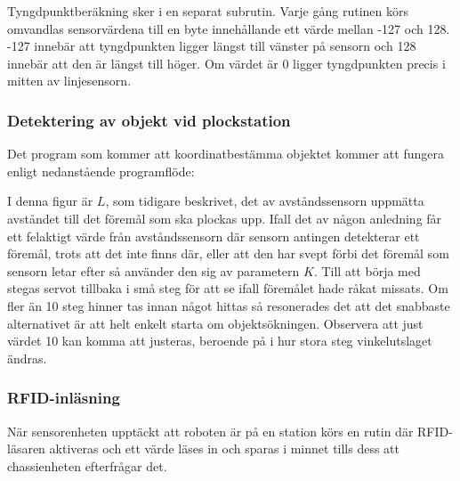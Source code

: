 Tyngdpunktberäkning sker i en separat subrutin. Varje gång rutinen körs omvandlas sensorvärdena till en byte innehållande ett värde mellan -127 och 128. -127 innebär att tyngdpunkten ligger längst till vänster på sensorn och 128 innebär att den är längst till höger. Om värdet är 0 ligger tyngdpunkten precis i mitten av linjesensorn.


\subsubsection{Detektering av objekt vid plockstation}

Det program som kommer att koordinatbestämma objektet kommer att fungera enligt nedanstående programflöde:



I denna figur är $L$, som tidigare beskrivet, det av avståndssensorn uppmätta avståndet till det föremål som ska plockas upp. Ifall det av någon anledning får ett felaktigt värde från avståndssensorn där sensorn antingen detekterar ett föremål, trots att det inte finns där, eller att den har svept förbi det föremål som sensorn letar efter så använder den sig av parametern $K$. Till att börja med stegas servot tillbaka i små steg för att se ifall föremålet hade råkat missats. Om fler än 10 steg hinner tas innan något hittas så resonerades det att det snabbaste alternativet är att helt enkelt starta om objektsökningen. Observera att just värdet 10 kan komma att justeras, beroende på i hur stora steg vinkelutslaget ändras.

\subsubsection{RFID-inläsning}

När sensorenheten upptäckt att roboten är på en station körs en rutin där RFID-läsaren aktiveras och ett värde läses in och sparas i minnet tills dess att chassienheten efterfrågar det.
